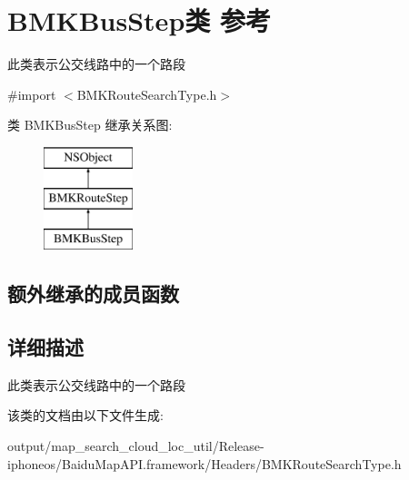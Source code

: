 \hypertarget{interface_b_m_k_bus_step}{}\section{B\+M\+K\+Bus\+Step类 参考}
\label{interface_b_m_k_bus_step}


此类表示公交线路中的一个路段  




{\ttfamily \#import $<$B\+M\+K\+Route\+Search\+Type.\+h$>$}

类 B\+M\+K\+Bus\+Step 继承关系图\+:\begin{figure}[H]
\begin{center}
\leavevmode
\includegraphics[height=3.000000cm]{interface_b_m_k_bus_step}
\end{center}
\end{figure}
\subsection*{额外继承的成员函数}


\subsection{详细描述}
此类表示公交线路中的一个路段 

该类的文档由以下文件生成\+:\begin{DoxyCompactItemize}
\item 
output/map\+\_\+search\+\_\+cloud\+\_\+loc\+\_\+util/\+Release-\/iphoneos/\+Baidu\+Map\+A\+P\+I.\+framework/\+Headers/B\+M\+K\+Route\+Search\+Type.\+h\end{DoxyCompactItemize}
